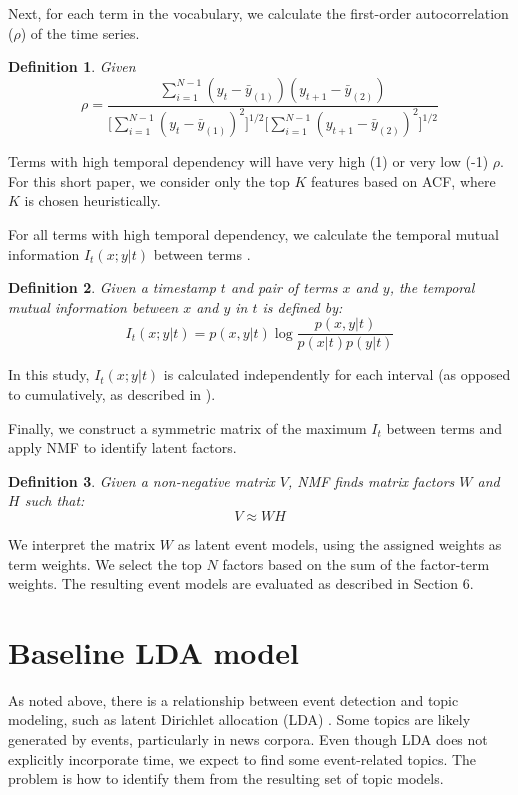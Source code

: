 \documentclass{sig-alternate}
\newtheorem{definition}{Definition}
\begin{document}
Next, for each term in the vocabulary, we calculate the first-order autocorrelation ($\rho$) of the time series. 
\begin{definition}
 Given 
\[
\rho = \dfrac{\sum_{i=1}^{N-1} (y_t - \bar{y}_{(1)})(y_{t+1} - \bar{y}_{(2)})}{ \big [ \sum_{i=1}^{N-1}  (y_t - \bar{y}_{(1)})^2 \big ] ^{1/2} \big [\sum_{i=1}^{N-1} (y_{t+1} - \bar{y}_{(2)})^2 \big ]^{1/2}}
\]
\end{definition}

Terms with high temporal dependency will have very high (1) or very low (-1) $\rho$.  For this short paper, we consider only the top $K$ features based on ACF, where $K$ is chosen heuristically.

For all terms with high temporal dependency, we calculate the temporal mutual information $I_t(x;y \vert t)$ between terms \cite{Teng2008}. 

\begin{definition}
Given a timestamp $t$ and pair of terms $x$ and $y$, the temporal mutual information between $x$ and $y$ in $t$ is defined by:
\[
I_t(x;y \vert t) = p(x,y \vert t) \log \dfrac{p(x,y \vert t)}{p(x \vert t) p(y \vert t)}
\]
\end{definition}

In this study, $I_t(x;y \vert t)$ is calculated independently for each interval (as opposed to cumulatively, as described in \cite{Teng2008}).

Finally, we construct a symmetric matrix of the maximum $I_t$ between terms and apply NMF \cite{Lee2001} to identify latent factors. 
\begin{definition}
 Given a non-negative matrix $V$, NMF finds matrix factors $W$ and $H$ such that:
\[
V \approx WH
\]
\end{definition}

We interpret the matrix $W$ as latent event models, using the assigned weights as term weights. We select the top $N$ factors based on the sum of the factor-term weights. The resulting event models are evaluated as described in Section 6.

\section{Baseline LDA model}

As noted above, there is a relationship between event detection and topic modeling, such as latent Dirichlet allocation (LDA) \cite{Blei2003}. Some topics are likely generated by events, particularly in news corpora. Even though LDA does not explicitly incorporate time, we expect to find some event-related topics.  The problem is how to identify them from the resulting set of topic models.
\end{document}
